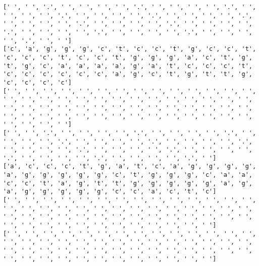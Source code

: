 \documentclass{article}
\begin{document}
\begin{Verbatim}
[' ', ' ', '.', ' ', ' ', ' ', ' ', '.', ' ', ' ', ' ', ' ', '.', ' ', ' ', ' ', ' ', '.', ' ', ' ', ' ', ' ', '.', ' ', ' ', ' ', ' ', '.', ' ', ' ', ' ', ' ', '.', ' ', ' ', ' ', ' ', '.', ' ', ' ', ' ', ' ', '.', ' ', ' ', ' ', ' ', '.', ' ', ' ', ' ', ' ', '.', ' ', ' ', ' ', ' ', '.', ' ', ' ']
['c', 'a', 'g', 'g', 'g', 'c', 't', 'c', 'c', 't', 'g', 'c', 'c', 't', 'c', 'c', 'c', 't', 'c', 'c', 't', 'g', 'g', 'g', 'a', 'c', 't', 'g', 't', 'g', 'c', 'a', 'a', 'a', 'a', 'g', 'a', 't', 'c', 'c', 'c', 't', 'c', 'c', 'c', 'c', 'c', 'c', 'a', 'g', 'c', 't', 'g', 't', 't', 'g', 'c', 'c', 'c', 'c']
[' ', ' ', ' ', ' ', ' ', ' ', ' ', ' ', ' ', ' ', ' ', ' ', ' ', ' ', ' ', ' ', ' ', ' ', ' ', ' ', ' ', ' ', ' ', ' ', ' ', ' ', ' ', ' ', ' ', ' ', ' ', ' ', ' ', ' ', ' ', ' ', ' ', ' ', ' ', ' ', ' ', ' ', ' ', ' ', ' ', ' ', ' ', ' ', ' ', ' ', ' ', ' ', ' ', ' ', ' ', ' ', ' ', ' ', ' ', ' ']
[' ', ' ', '.', ' ', ' ', ' ', ' ', '.', ' ', ' ', ' ', ' ', '.', ' ', ' ', ' ', ' ', '.', ' ', ' ', ' ', ' ', '.', ' ', ' ', ' ', ' ', '.', ' ', ' ', ' ', ' ', '.', ' ', ' ', ' ', ' ', '.', ' ', ' ', ' ', ' ', '.', ' ', ' ', ' ', ' ', '.', ' ', ' ', ' ', ' ', '.', ' ']
['a', 'c', 'c', 'c', 't', 'g', 'a', 't', 'c', 'a', 'g', 'g', 'g', 'g', 'a', 'g', 'g', 'g', 'g', 'g', 'c', 't', 'g', 'g', 'g', 'c', 'a', 'a', 'c', 'c', 't', 'a', 'g', 't', 't', 'g', 'g', 'g', 'g', 'g', 'a', 'g', 'a', 'g', 'g', 'g', 'g', 'g', 'c', 'c', 'a', 'c', 't', 'c']
[' ', ' ', ' ', ' ', ' ', ' ', ' ', ' ', ' ', ' ', ' ', ' ', ' ', ' ', ' ', ' ', ' ', ' ', ' ', ' ', ' ', ' ', ' ', ' ', ' ', ' ', ' ', ' ', ' ', ' ', ' ', ' ', ' ', ' ', ' ', ' ', ' ', ' ', ' ', ' ', ' ', ' ', ' ', ' ', ' ', ' ', ' ', ' ', ' ', ' ', ' ', ' ', ' ', ' ']
[' ', ' ', ' ', ' ', ' ', ' ', ' ', ' ', ' ', ' ', ' ', ' ', ' ', ' ', ' ', ' ', ' ', ' ', ' ', ' ', ' ', ' ', ' ', ' ', ' ', ' ', ' ', ' ', ' ', ' ', ' ', ' ', ' ', ' ', ' ', ' ', ' ', ' ', ' ', ' ', ' ', ' ', ' ', ' ', ' ', ' ', ' ', ' ', ' ', ' ', ' ', ' ', ' ', ' ']
 

\end{Verbatim}
\end{document}
